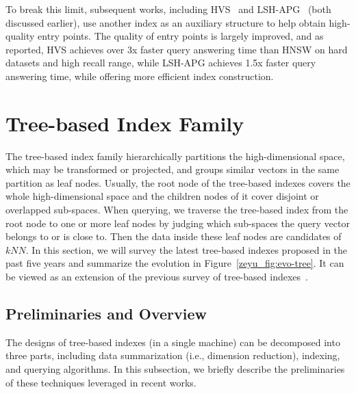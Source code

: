 \documentclass[11pt]{article}
\begin{document}
To break this limit, subsequent works, including HVS~\cite{hvs} and LSH-APG~\cite{lsh-apg} (both discussed earlier), use another index as an auxiliary structure to help obtain high-quality entry points.
The quality of entry points is largely improved, and as reported, HVS achieves over 3x faster query answering time than HNSW on hard datasets and high recall range, while LSH-APG achieves 1.5x faster query answering time, while offering more efficient index construction.








\section{Tree-based Index Family}
\label{zeyu_sec:tree}
The tree-based index family hierarchically partitions the high-dimensional space, which may be transformed or projected, and groups similar vectors in the same partition as leaf nodes.
Usually, the root node of the tree-based indexes covers the whole high-dimensional space and the children nodes of it cover disjoint or overlapped sub-spaces.
When querying, we traverse the tree-based index from the root node to one or more leaf nodes by judging which sub-spaces the query vector belongs to or is close to.
Then the data inside these leaf nodes are candidates of $kNN$.
In this section, we will survey the latest tree-based indexes proposed in the past five years and summarize the evolution in Figure~\ref{zeyu_fig:evo-tree}.
It can be viewed as an extension of the previous survey of tree-based indexes~\cite{evolution}.

\subsection{Preliminaries and Overview}
The designs of tree-based indexes (in a single machine) can be decomposed into three parts, including data summarization (i.e., dimension reduction), indexing, and querying algorithms.
In this subsection, we briefly describe the preliminaries of these techniques leveraged in recent works.
\end{document}
